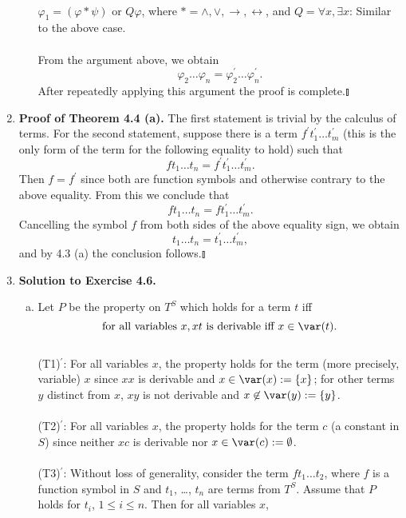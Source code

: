 \begin{enumerate}[1.]
\begin{enumerate}[(a)]
\ 
\\ $\varphi_1 = (\varphi \ast \psi)$ or $Q\varphi$, where $\ast = \land, \lor, \rightarrow, \leftrightarrow$, and $Q = \forall x, \exists x$: Similar to the above case. \\
\ 
\\From the argument above, we obtain
\[
\varphi_2 \ldots \varphi_n = \varphi_2^\prime \ldots \varphi_n^\prime.
\]
After repeatedly applying this argument the proof is complete.\nolinebreak\hfill$\talloblong$
\end{enumerate}
%
\item \textbf{Proof of Theorem 4.4 (a).} The first statement is trivial by the calculus of terms. For the second statement, suppose there is a term $f^\prime t_1^\prime \ldots t_m^\prime$ (this is the only form of the term for the following equality to hold) such that
\[
f t_1 \ldots t_n = f^\prime t_1^\prime \ldots t_m^\prime.
\]
Then $f = f^\prime$ since both are function symbols and otherwise contrary to the above equality. From this we conclude that
\[
f t_1 \ldots t_n = f t_1^\prime \ldots t_m^\prime.
\]
Cancelling the symbol $f$ from both sides of the above equality sign, we obtain
\[
t_1 \ldots t_n = t_1^\prime \ldots t_m^\prime ,
\]
and by 4.3 (a) the conclusion follows.\nolinebreak\hfill$\talloblong$
%
\item \textbf{Solution to Exercise 4.6.}
\begin{enumerate}[(a)]
\item Let $P$ be the property on $T^S$ which holds for a term $t$ iff
\[
\mbox{for all variables } x, xt \mbox{ is derivable iff } x \in \var (t).
\]
\ 
\\
(T1)$^\prime$: For all variables $x$, the property holds for the term (more precisely, variable) $x$ since $xx$ is derivable and $x \in \var(x):=\{x\}$; for other terms $y$ distinct from $x$, $xy$ is not derivable and $x \not \in \var(y):=\{y\}$.\\
\\
(T2)$^\prime$: For all variables $x$, the property holds for the term $c$ (a constant in $S$) since neither $xc$ is derivable nor $x \in \var(c):=\emptyset$.\\
\\
(T3)$^\prime$: Without loss of generality, consider the term $ft_1 \ldots t_2$, where $f$ is a function symbol in $S$ and $t_1$, \ldots, $t_n$ are terms from $T^S$. Assume that $P$ holds for $t_i$, $1 \leq i \leq n$. Then for all variables $x$, \\

\end{enumerate}
\end{enumerate}

